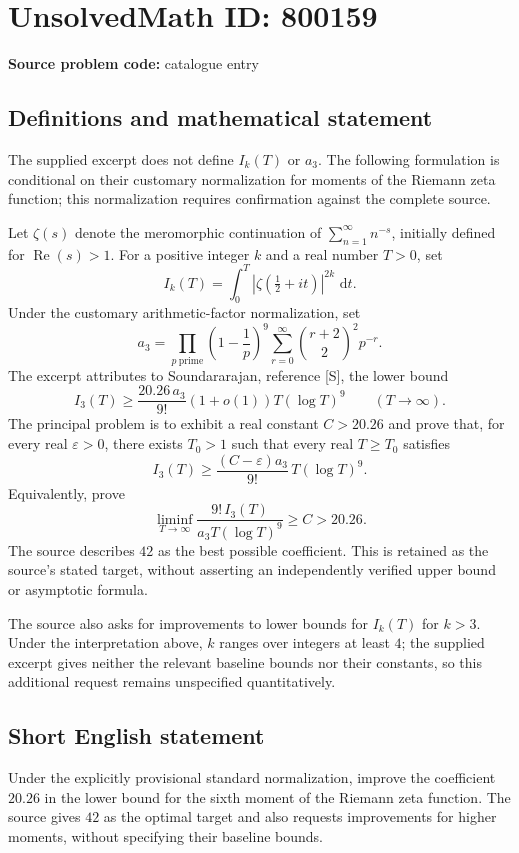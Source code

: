 \documentclass[11pt]{article}
\newcommand{\dd}{\,\mathrm{d}}
\begin{document}
\section*{UnsolvedMath ID: 800159}
\textbf{Source problem code:} catalogue entry
\subsection{Definitions and mathematical statement}
The supplied excerpt does not define \(I_k(T)\) or \(a_3\). The following formulation is conditional on their customary normalization for moments of the Riemann zeta function; this normalization requires confirmation against the complete source.

Let \(\zeta(s)\) denote the meromorphic continuation of \(\sum_{n=1}^{\infty}n^{-s}\), initially defined for \(\operatorname{Re}(s)>1\). For a positive integer \(k\) and a real number \(T>0\), set
\[
I_k(T)=\int_0^T\left|\zeta\!\left(\tfrac12+it\right)\right|^{2k}\,\dd t.
\]
Under the customary arithmetic-factor normalization, set
\[
a_3=\prod_{p\ \mathrm{prime}}\left(1-\frac1p\right)^9
\sum_{r=0}^{\infty}\binom{r+2}{2}^{\!2}p^{-r}.
\]
The excerpt attributes to Soundararajan, reference [S], the lower bound
\[
I_3(T)\geq \frac{20.26\,a_3}{9!}(1+o(1))T(\log T)^9
\qquad(T\to\infty).
\]
The principal problem is to exhibit a real constant \(C>20.26\) and prove that, for every real \(\varepsilon>0\), there exists \(T_0>1\) such that every real \(T\geq T_0\) satisfies
\[
I_3(T)\geq \frac{(C-\varepsilon)a_3}{9!}\,T(\log T)^9.
\]
Equivalently, prove
\[
\liminf_{T\to\infty}\frac{9!\,I_3(T)}{a_3T(\log T)^9}\geq C>20.26.
\]
The source describes \(42\) as the best possible coefficient. This is retained as the source's stated target, without asserting an independently verified upper bound or asymptotic formula.

The source also asks for improvements to lower bounds for \(I_k(T)\) for \(k>3\). Under the interpretation above, \(k\) ranges over integers at least \(4\); the supplied excerpt gives neither the relevant baseline bounds nor their constants, so this additional request remains unspecified quantitatively.
\subsection{Short English statement}
Under the explicitly provisional standard normalization, improve the coefficient \(20.26\) in the lower bound for the sixth moment of the Riemann zeta function. The source gives \(42\) as the optimal target and also requests improvements for higher moments, without specifying their baseline bounds.
\end{document}
